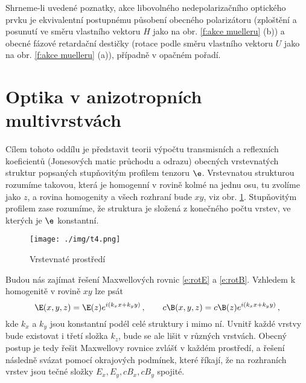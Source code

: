 Shrneme-li uvedené poznatky, akce libovolného nedepolarizačního optického prvku je ekvivalentní postupnému působení obecného polarizátoru (zploštění a posunutí ve směru vlastního vektoru $H$ jako na obr. \ref{f:akce muelleru} (b)) a obecné fázové retardační destičky (rotace podle směru vlastního vektoru $U$ jako na obr. \ref{f:akce muelleru} (a)), případně v opačném pořadí.

\section{Optika v anizotropních multivrstvách \cite{Berreman}}

Cílem tohoto oddílu je představit teorii výpočtu transmisních a reflexních koeficientů (Jonesových matic průchodu a odrazu) obecných vrstevnatých struktur popsaných stupňovitým profilem tenzoru $\e$. 
Vrstevnatou strukturou rozumíme takovou, která je homogenní v rovině kolmé na jednu osu, tu zvolíme jako $z$, a rovina homogenity a všech rozhraní bude $xy$, viz obr. \ref{f:vrstevnate prostredi}.
Stupňovitým profilem zase rozumíme, že struktura je složená z konečného počtu vrstev, ve kterých je $\e$ konstantní.

\begin{figure}\centering
\texttt{[image: ./img/t4.png]}
\caption{Vrstevnaté prostředí}\label{f:vrstevnate prostredi}
\end{figure}

Budou nás zajímat řešení Maxwellových rovnic \eqref{e:rotE} a \eqref{e:rotB}.
Vzhledem k homogenitě v rovině $xy$ lze psát
\begin{equation} \label{e:kxy}
\E(x,y,z)=\E(z) e^{i(k_xx+k_yy)} \,, \qquad c\B(x,y,z)=c\B(z) e^{i(k_xx+k_yy)} \,,
\end{equation}
kde $k_x$ a $k_y$ jsou konstantní podél celé struktury i mimo ní.
Uvnitř každé vrstvy bude existovat i třetí složka $k_z$, bude se ale lišit v různých vrstvách.
Obecný postup je tedy řešit Maxwellovy rovnice zvlášť v každém prostředí, a řešení následně svázat pomocí okrajových podmínek, které říkají, že na rozhraních vrstev jsou tečné složky $E_x, E_y, cB_x, cB_y$ spojité.

